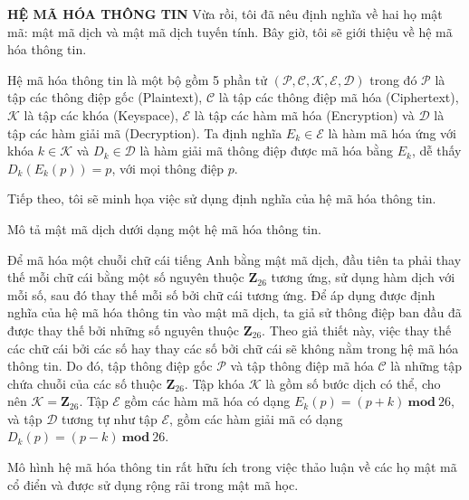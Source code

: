\noindent \textcolor{Mycolor}{\textbf{HỆ MÃ HÓA THÔNG TIN}} Vừa rồi, tôi đã nêu định nghĩa về hai họ mật mã: mật mã dịch và mật mã dịch tuyến tính. Bây giờ, tôi sẽ giới thiệu về hệ mã hóa thông tin.
\begin{center}
    \colorbox{Mycolor2}{
        \begin{minipage}{1\textwidth}
            \begin{definition}
                Hệ mã hóa thông tin là một bộ gồm 5 phần tử $(\mathcal{P,C,K,E,D})$ trong đó $\mathcal{P}$ là tập các thông điệp gốc (Plaintext), $\mathcal{C}$ là tập các thông điệp mã hóa (Ciphertext), $\mathcal{K}$ là tập các khóa (Keyspace), $\mathcal{E}$ là tập các hàm mã hóa (Encryption) và $\mathcal{D}$ là tập các hàm giải mã (Decryption). Ta định nghĩa $E_k \in \mathcal{E}$ là hàm mã hóa ứng với khóa $k \in \mathcal{K}$ và $D_k \in \mathcal{D}$ là hàm giải mã thông điệp được mã hóa bằng $E_k$, dễ thấy $D_k(E_k(p)) = p$, với mọi thông điệp $p$.
            \end{definition}
        \end{minipage}
    }
\end{center}
Tiếp theo, tôi sẽ minh họa việc sử dụng định nghĩa của hệ mã hóa thông tin.
\begin{example}
    Mô tả mật mã dịch dưới dạng một hệ mã hóa thông tin.
\end{example}
\begin{solution}
    Để mã hóa một chuỗi chữ cái tiếng Anh bằng mật mã dịch, đầu tiên ta phải thay thế mỗi chữ cái bằng một số nguyên thuộc $\mathbf{Z}_{26}$ tương ứng, sử dụng hàm dịch với mỗi số, sau đó thay thế mỗi số bởi chữ cái tương ứng. Để áp dụng được định nghĩa của hệ mã hóa thông tin vào mật mã dịch, ta giả sử thông điệp ban đầu đã được thay thế bởi những số nguyên thuộc $\mathbf{Z}_{26}$. Theo giả thiết này, việc thay thế các chữ cái bởi các số hay thay các số bởi chữ cái sẽ không nằm trong hệ mã hóa thông tin. Do đó, tập thông điệp gốc $\mathcal{P}$ và tập thông điệp mã hóa $\mathcal{C}$ là những tập chứa chuỗi của các số thuộc $\mathbf{Z}_{26}$. Tập khóa $\mathcal{K}$ là gồm số bước dịch có thể, cho nên $\mathcal{K} = \mathbf{Z}_{26}$. Tập $\mathcal{E}$ gồm các hàm mã hóa có dạng $E_k(p) = (p+k)\ \mathbf{mod}\ 26$, và tập $\mathcal{D}$ tương tự như tập $\mathcal{E}$, gồm các hàm giải mã có dạng $D_k(p) = (p-k)\ \mathbf{mod}\ 26$.
\end{solution}

Mô hình hệ mã hóa thông tin rất hữu ích trong việc thảo luận về các họ mật mã cổ điển và được sử dụng rộng rãi trong mật mã học.